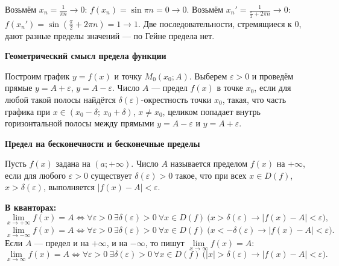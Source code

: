 \documentclass[a4paper,11pt]{article}
\newcommand{\eps}{\varepsilon}
\newcommand{\kv}{\par\noindent\textbf{\textcolor{oprc!85!black}{В кванторах:}}}
\newcommand{\podr}[1]{\par\needspace{8\baselineskip}\medskip
  {\large\bfseries\textcolor{oprc!80!black}{#1}}\par\nopagebreak\smallskip}
\begin{document}
\begin{dop}[как по Гейне доказать, что предела нет: $f(x) = \sin\frac1x$ при $x \to 0$]
Возьмём $x_n = \frac{1}{\pi n} \to 0$: $f(x_n) = \sin \pi n = 0 \to 0$.
Возьмём $x_n' = \frac{1}{\frac\pi2 + 2\pi n} \to 0$: $f(x_n') = \sin\left(\frac\pi2 + 2\pi n\right) = 1 \to 1$.
Две последовательности, стремящиеся к $0$, дают разные пределы значений --- по Гейне предела нет.
\end{dop}

\podr{Геометрический смысл предела функции}

Построим график $y = f(x)$ и точку $M_0(x_0; A)$. Выберем $\eps > 0$ и проведём прямые $y = A + \eps$, $y = A - \eps$.
Число $A$ --- предел $f(x)$ в точке $x_0$, если для любой такой полосы найдётся $\delta(\eps)$-окрестность точки $x_0$, такая, что
часть графика при $x \in (x_0 - \delta;\ x_0 + \delta)$, $x \ne x_0$, целиком попадает внутрь горизонтальной полосы между прямыми
$y = A - \eps$ и $y = A + \eps$.

\begin{center}
\end{center}

\podr{Предел на бесконечности и бесконечные пределы}

\begin{opr}
Пусть $f(x)$ задана на $(a; +\infty)$. Число $A$ называется пределом $f(x)$ на $+\infty$, если для любого $\eps > 0$ существует
$\delta(\eps) > 0$ такое, что при всех $x \in D(f)$, $x > \delta(\eps)$, выполняется $|f(x) - A| < \eps$.
\kv
\[
  \lim_{x \to +\infty} f(x) = A \Leftrightarrow \forall \eps > 0\ \exists \delta(\eps) > 0\
  \forall x \in D(f)\ \bigl( x > \delta(\eps) \to |f(x) - A| < \eps \bigr),
\]
\[
  \lim_{x \to -\infty} f(x) = A \Leftrightarrow \forall \eps > 0\ \exists \delta(\eps) > 0\
  \forall x \in D(f)\ \bigl( x < -\delta(\eps) \to |f(x) - A| < \eps \bigr).
\]
Если $A$ --- предел и на $+\infty$, и на $-\infty$, то пишут $\lim\limits_{x \to \infty} f(x) = A$:
\[
  \lim_{x \to \infty} f(x) = A \Leftrightarrow \forall \eps > 0\ \exists \delta(\eps) > 0\
  \forall x \in D(f)\ \bigl( |x| > \delta(\eps) \to |f(x) - A| < \eps \bigr).
\]
\end{opr}
\end{document}
